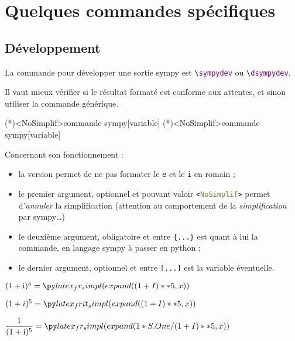 \documentclass[french,a4paper,11pt]{article}
\newcommand\Cle[1]{{\bfseries\sffamily\textlangle #1\textrangle}}
\begin{document}
\section{Quelques commandes spécifiques}

\subsection{Développement}

\begin{cautionblock}
La commande pour développer une sortie \textsf{sympy} est \texttt{\textbackslash \textcolor{purple}{sympydev}} ou \texttt{\textbackslash \textcolor{purple}{dsympydev}}.

Il vaut mieux vérifier si le résultat formaté est conforme aux attentes, et sinon utiliser la commande générique.
\end{cautionblock}

\begin{bloctext}
\sympydev(*)<NoSimplif>{commande sympy}[variable]
\dsympydev(*)<NoSimplif>{commande sympy}[variable]
\end{bloctext}

\begin{tipblock}
Concernant son fonctionnement :

\begin{itemize}
	\item la version \Cle{*} permet de ne pas formater le \texttt{e} et le \texttt{i} en \textsf{romain} ;
	\item le premier argument, optionnel et pouvant valoir \texttt{<\textcolor{OliveDrab}{NoSimplif}>} permet d'\textit{annuler} la simplification (attention au comportement de la \textit{simplification} par \textsf{sympy}\ldots)
	\item le deuxième argument, obligatoire et entre \texttt{\{...\}} est quant à lui la commande, en langage \textsf{sympy} à passer en \textsf{python} ;
	\item le dernier argument, optionnel et entre \texttt{[...]} est la variable éventuelle.
\end{itemize}
\vspace*{-\baselineskip}\leavevmode
\end{tipblock}

\begin{bloctext}
$(1+\text{i})^5 = \sympydev{(1+I)**5}$          %

$(1+i)^5 = \sympydev*{(1+I)**5}$

$\dfrac{1}{(1+\text{i})^5} = \dsympydev{1/(1+I)**5}$
\end{bloctext}
\end{document}
